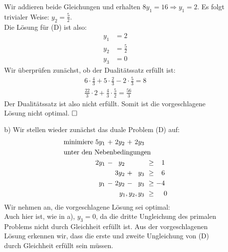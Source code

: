 \documentclass [a4paper,11pt]{article}
\begin{document}
\begin{enumerate}
\begin{enumerate}
                    Wir addieren beide Gleichungen und erhalten $8y_1 = 16 \Rightarrow y_1 = 2$. Es folgt trivialer Weise: $y_2 = \frac{5}{2}$.\\
                    Die Lösung für (D) ist also:
                    \begin{align*}
                        y_1 &= 2\\
                        y_2 &= \frac{5}{2}\\
                        y_3 &= 0
                    \end{align*}
                    Wir überprüfen zunächst, ob der Dualitätssatz erfüllt ist:
                    \begin{align*}
                        6 \cdot \frac{4}{3} + 5 \cdot \frac{2}{3} - 2 \cdot \frac{5}{3} = 8\\
                        \frac{22}{3} \cdot 2 + \frac{4}{3} \cdot \frac{5}{2} = \frac{56}{3}
                    \end{align*}
                    Der Dualitätssatz ist also nicht erfüllt. Somit ist die vorgeschlagene Lösung nicht optimal. $\qed$
                \item[b)]
                    Wir stellen wieder zunächst das duale Problem (D) auf:
                    \begin{align*}
                    \begin{alignedat}{6}
                    & \text{minimiere } & 5y_1 &\ + &\ 2y_2 &\ + &\ 2y_3 & & \\
                    & \rlap{unter den Nebenbedingungen} & & & & & & & \\
                    && 2y_1 &\ - &\  y_2 &    &       &\ \geq &\  1\ \\
                    &&      &    &\ 3y_2 &\ + &\  y_3 &\ \geq &\  6\ \\
                    &&  y_1 &\ - &\ 2y_2 &\ - &\  y_3 &\ \geq &\ -4\ \\
                    && & & & & \llap{$y_1,y_2,y_3$} &\ \geq &\ 0
                    \end{alignedat}
                    \end{align*}
                    Wir nehmen an, die vorgeschlagene Lösung sei optimal: \\
                    Auch hier ist, wie in a), $y_3 = 0$, da die dritte Ungleichung des primalen Problems nicht durch Gleichheit erfüllt ist. Aus der
                    vorgeschlagenen Lösung erkennen wir, dass die erste und zweite Ungleichung von (D) durch Gleichheit erfüllt sein müssen.

\end{enumerate}
\end{enumerate}
\end{document}
